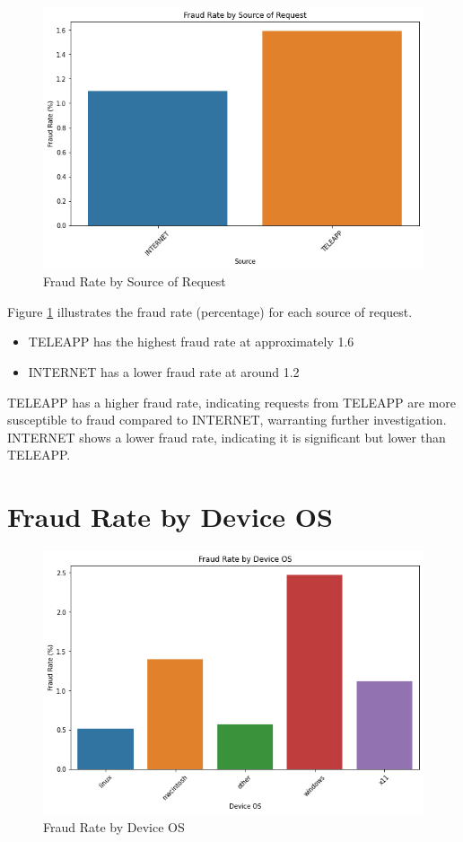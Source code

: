 \documentclass[12pt,a4paper]{report}
\begin{document}
\begin{figure}
    \centering
    \includegraphics[width=\textwidth]{Fraud_Rate_by_Source_of_Request.png}
    \caption{Fraud Rate by Source of Request}
    \label{fig:fraud_rate_source_of_request}
\end{figure}

Figure \ref{fig:fraud_rate_source_of_request} illustrates the fraud rate (percentage) for each source of request. 

\begin{itemize}
    \item TELEAPP has the highest fraud rate at approximately 1.6%
    \item INTERNET has a lower fraud rate at around 1.2%
\end{itemize}

TELEAPP has a higher fraud rate, indicating requests from TELEAPP are more susceptible to fraud compared to INTERNET, warranting further investigation. INTERNET shows a lower fraud rate, indicating it is significant but lower than TELEAPP.

\section{Fraud Rate by Device OS}

\begin{figure}
    \centering
    \includegraphics[width=\textwidth]{device_os_fraud_rate.png}
    \caption{Fraud Rate by Device OS}
    \label{fig:device_os_fraud_rate}
\end{figure}
\end{document}

